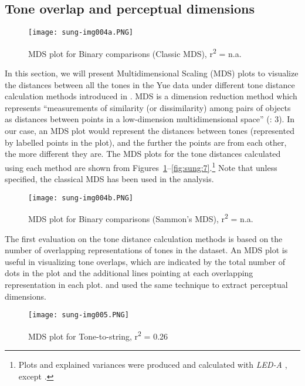\documentclass[output=paper, chinesefont]{langscibook}
\begin{document}
\subsection{Tone overlap and perceptual dimensions}
\label{sec:sung:5.1}
   
\begin{figure}
\texttt{[image: sung-img004a.PNG]}
\caption{\label{fig:sung:4a}MDS plot for Binary comparisons (Classic MDS), r\textsuperscript{2} = n.a.}
\end{figure}

In this section, we will present Multidimensional Scaling (MDS) plots to visualize the distances between all the tones in the Yue data under different tone distance calculation methods introduced in . MDS is a dimension reduction method which represents “measurements of similarity (or dissimilarity) among pairs of objects as distances between points in a low-dimension multidimensional space” (\citealt{BorgGroenen2005}: 3). In our case, an MDS plot would represent the distances between tones (represented by labelled points in the plot), and the further the points are from each other, the more different they are. The MDS plots for the tone distances calculated using each method are shown from Figures~\ref{fig:sung:4a}--\ref{fig:sung:7}.\footnote{Plots and explained variances were produced and calculated with \textit{LED-A} \citep{HeeringaEtAl2022}, except .}  Note that unless specified, the classical MDS has been used in the analysis.

   
\begin{figure}
\texttt{[image: sung-img004b.PNG]}
\caption{\label{fig:sung:4b} MDS plot for Binary comparisons (Sammon’s MDS), r\textsuperscript{2} = n.a.}
\end{figure}

The first evaluation on the tone distance calculation methods is based on the number of overlapping representations of tones in the dataset. An MDS plot is useful in visualizing tone overlaps, which are indicated by the total number of dots in the plot and the additional lines pointing at each overlapping representation in each plot. \citet{GandourHarshman1978} and \citet{Gandour1983} used the same technique to extract perceptual dimensions.

   
\begin{figure}
\texttt{[image: sung-img005.PNG]}
\caption{MDS plot for Tone-to-string, r\textsuperscript{2} = 0.26}
\label{fig:sung:5}
\end{figure}
\end{document}
